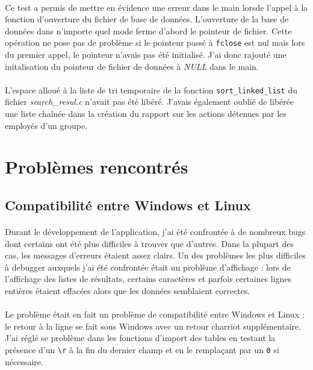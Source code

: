 \documentclass{article}
\begin{document}
    \paragraph{}
    Ce test a permis de mettre en évidence une erreur dans le main lorsde l'appel à la fonction d'ouverture du fichier de base de données. L'ouverture de la base de données dans n'importe quel mode ferme d'abord le pointeur de fichier. Cette opération ne pose pas de problème si le pointeur passé à \texttt{fclose} est nul mais lors du premier appel, le pointeur n'avais pas été initialisé. J'ai donc rajouté une initalisation du pointeur de fichier de données à \emph{NULL} dans le main.

    \paragraph{}
    L'espace alloué à la liste de tri temporaire de la fonction \texttt{sort\_linked\_list} du fichier \emph{search\_resul.c} n'avait pas été libéré. J'avais également oublié de libérée une liste chaînée dans la création du rapport sur les actions détenues par les employés d'un groupe.



    \newpage
    \section{Problèmes rencontrés}

    \subsection{Compatibilité entre Windows et Linux}
    \paragraph{}
    Durant le développement de l'application, j'ai été confrontée à de nombreux bugs dont certains ont été plus difficiles à trouver que d'autres. Dans la plupart des cas, les messages d'erreurs étaient assez clairs. Un des problèmes les plus difficiles à debugger auxquels j'ai été confrontée était un problème d'affichage : lors de l'affichage des listes de résultats, certains caractères et parfois certaines lignes entières étaient effacées alors que les données semblaient correctes.

    \paragraph{}
    Le problème était en fait un problème de compatibilité entre Windows et Linux : le retour à la ligne se fait sous Windows avec un retour charriot supplémentaire. J'ai réglé se problème dans les fonctions d'import des tables en testant la présence d'un \texttt{\textbackslash r} à la fin du dernier champ et en le remplaçant par un \texttt{0} si nécessaire.
\end{document}
